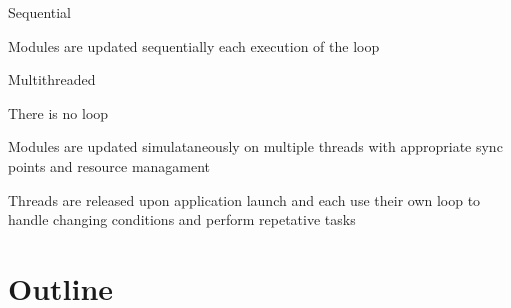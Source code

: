 \begin{DoxyItemize}
\item Sequential
\begin{DoxyItemize}
\item Modules are updated sequentially each execution of the loop
\end{DoxyItemize}
\item Multithreaded
\begin{DoxyItemize}
\item There is no loop
\item Modules are updated simulataneously on multiple threads with appropriate sync points and resource managament
\item Threads are released upon application launch and each use their own loop to handle changing conditions and perform repetative tasks
\end{DoxyItemize}
\end{DoxyItemize}\hypertarget{main_outline}{}\section{Outline}\label{main_outline}

